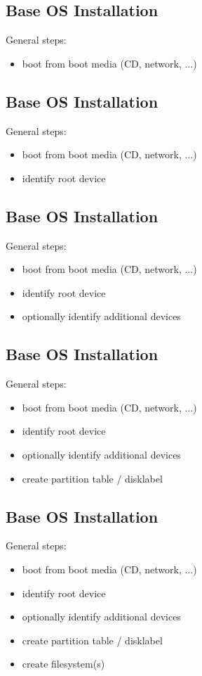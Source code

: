\documentclass[xga]{xdvislides}
\begin{document}
\subsection{Base OS Installation}
General steps:
\begin{itemize}
	\item boot from boot media (CD, network, ...)
\end{itemize}

\subsection{Base OS Installation}
General steps:
\begin{itemize}
	\item boot from boot media (CD, network, ...)
	\item identify root device
\end{itemize}

\subsection{Base OS Installation}
General steps:
\begin{itemize}
	\item boot from boot media (CD, network, ...)
	\item identify root device
	\item optionally identify additional devices
\end{itemize}

\subsection{Base OS Installation}
General steps:
\begin{itemize}
	\item boot from boot media (CD, network, ...)
	\item identify root device
	\item optionally identify additional devices
	\item create partition table / disklabel
\end{itemize}

\subsection{Base OS Installation}
General steps:
\begin{itemize}
	\item boot from boot media (CD, network, ...)
	\item identify root device
	\item optionally identify additional devices
	\item create partition table / disklabel
	\item create filesystem(s)
\end{itemize}
\end{document}
